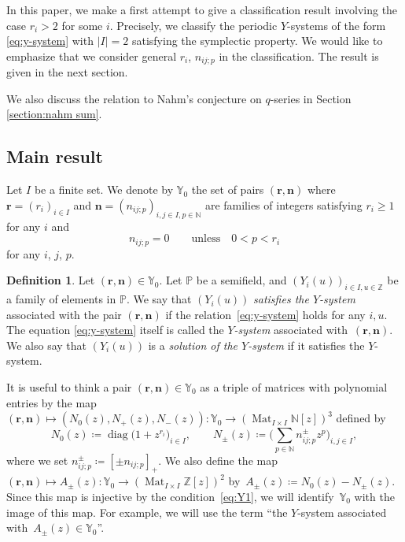 \documentclass[pdftex]{sigma}
\numberwithin{equation}{section}
\theoremstyle{definition}
\newtheorem{Definition}[Theorem]{Definition}
\DeclareMathOperator{\diag}{diag}
\DeclareMathOperator{\mat}{Mat}
\newcommand*{\maxzero}[1]{[#1]_{+}}
\begin{document}
In this paper, we make a first attempt to give a classification result involving the case $r_i > 2$ for some $i$.
Precisely, we classify the periodic $Y$-systems of the form \eqref{eq:y-system} with $\lvert I \rvert = 2$ satisfying the symplectic property.
We would like to emphasize that we consider general $r_i$, $n_{ij;p}$ in the classification.
The result is given in the next section.

We also discuss the relation to Nahm's conjecture on $q$-series \cite{Nahm, Zagier}
in Section \ref{section:nahm sum}.

\subsection{Main result}\label{section:main relsult}
Let $I$ be a finite set.
We denote by $\mathbb{Y}_0$ the set of pairs $(\bm{r}, \bm{n})$ where $\bm{r} = (r_i)_{i \in I}$ and $\bm{n} = (n_{ij;p})_{i, j \in I, p \in \mathbb{N}}$
are families of integers satisfying $r_i \geq 1$ for any $i$ and
\begin{equation}\label{eq:Y1}
n_{ij;p} = 0\qquad \text{unless} \quad 0 < p < r_i
\end{equation}
for any $i$, $j$, $p$.

\begin{Definition}
 Let $(\bm{r}, \bm{n}) \in \mathbb{Y}_0$.
 Let $\mathbb{P}$ be a semifield, and $(Y_i(u))_{i \in I, u \in \mathbb{Z}}$ be a family of
 elements in $\mathbb{P}$.
 We say that $(Y_i(u))$ \emph{satisfies the $Y$-system} associated with the pair $(\bm{r}, \bm{n})$ if the relation~\eqref{eq:y-system}
 holds for any $i,u$.
 The equation \eqref{eq:y-system} itself is called the \emph{$Y$-system} associated with~$(\bm{r}, \bm{n})$.
 We also say that $(Y_i(u))$ is a \emph{solution of the $Y$-system} if it satisfies the $Y$-system.
\end{Definition}

It is useful to think a pair $(\bm{r}, \bm{n}) \in \mathbb{Y}_0$ as a triple of matrices with polynomial entries
by the map
$(\bm{r}, \bm{n}) \mapsto (N_0(z), N_+(z), N_-(z)) \colon \mathbb{Y}_0 \to (\mat_{I \times I} \mathbb{N} [z])^3$ defined by
\[
 N_0(z) \coloneqq \diag\bigl(1 + z^{r_i}\bigr)_{i \in I}, \qquad
 N_{\pm} (z) \coloneqq \biggr(\sum_{p \in \mathbb{N}} n_{ij;p}^\pm z^p \biggl)_{i, j \in I},
\]
where we set $n_{ij;p}^\pm \coloneqq \maxzero{\pm n_{ij;p}}$.
We also define the map $(\bm{r}, \bm{n}) \mapsto A_\pm (z)\colon \mathbb{Y}_0 \to (\mat_{I \times I} \mathbb{Z} [z])^2$
by~${A_{\pm}(z) \coloneqq N_0(z) - N_{\pm}(z)}$.
Since this map is injective by the condition~\eqref{eq:Y1},
we will identify~$\mathbb{Y}_0$ with the image of this map.
For example, we will use the term ``the $Y$-system associated with~${A_\pm (z) \in \mathbb{Y}_0}$''.
\end{document}
